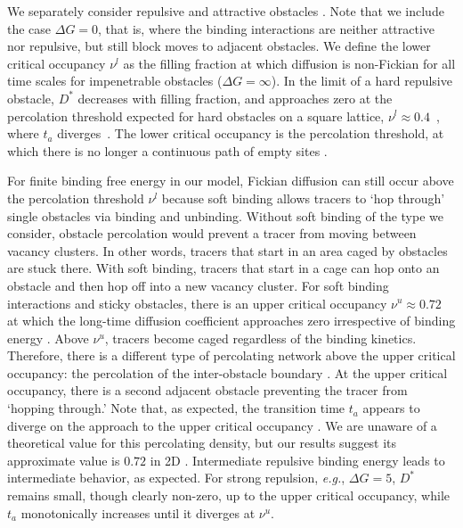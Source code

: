We separately consider repulsive and attractive obstacles
.  Note that we include the case $\Delta G=0$, that is,
where the binding interactions are neither attractive nor repulsive, but still
block moves to adjacent obstacles.  We define the lower critical occupancy
$\nu^l$ as the filling fraction at which diffusion is non-Fickian for all time
scales for impenetrable obstacles ($\Delta G = \infty$).  In the limit of a hard
repulsive obstacle, $D^*$ decreases with filling fraction, and approaches zero
at the percolation threshold expected for hard obstacles on a square lattice,
$\nu^l \approx 0.4$~\cite{stauffer_introduction_94}, where $t_a$
diverges~\cite{saxton_lateral_87}.  The lower critical occupancy is the
percolation threshold, at which there is no longer a continuous path of empty
sites .


For finite binding free energy in our model, Fickian diffusion can still occur
above the percolation threshold $\nu^l$ because soft binding allows tracers to
`hop through' single obstacles via binding and unbinding. Without soft binding
of the type we consider, obstacle percolation would prevent a tracer from moving
between vacancy clusters. In other words, tracers that start in an area caged by
obstacles are stuck there.  With soft binding, tracers that start in a cage can
hop onto an obstacle and then hop off into a new vacancy cluster.  For soft
binding interactions and sticky obstacles, there is an upper critical occupancy
$ \nu^u \approx 0.72 $ at which the long-time diffusion coefficient approaches
zero irrespective of binding energy . Above $\nu^u$,
tracers become caged regardless of the binding kinetics.  Therefore, there is a
different type of percolating network above the upper critical occupancy: the
percolation of the inter-obstacle boundary .  At the
upper critical occupancy, there is a second adjacent obstacle preventing the
tracer from `hopping through.' Note that, as expected, the transition time $t_a$
appears to diverge on the approach to the upper critical occupancy
.  We are unaware of a theoretical value for this
percolating density, but our results suggest its approximate value is $0.72$ in
2D .  Intermediate repulsive binding energy leads to
intermediate behavior, as expected. For strong repulsion, \textit{e.g.}, $\Delta
G=5$, $D^*$ remains small, though clearly non-zero, up to the upper critical
occupancy, while $t_a$ monotonically increases until it diverges at $\nu^u$.

